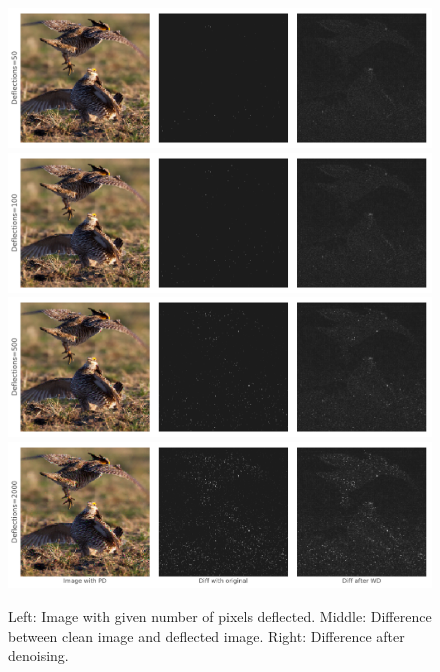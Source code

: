 \begin{figure}[H]
   \includegraphics[width=1\linewidth, scale=0.9]{figures/pixel/image_corruption_x_50.pdf}
   \includegraphics[width=1\linewidth, scale=0.9]{figures/pixel/image_corruption_x_100.pdf}
   \includegraphics[width=1\linewidth, scale=0.9]{figures/pixel/image_corruption_x_500.pdf}
   \includegraphics[width=1\linewidth, scale=0.9]{figures/pixel/image_corruption_x_2000.pdf}
   \label{fig:pixeldeflection}
   \caption[Impact Of Pixel Deflection]{Left: Image with given number of pixels deflected. Middle: Difference between clean image and deflected image. Right: Difference after denoising.}
   
\end{figure}


